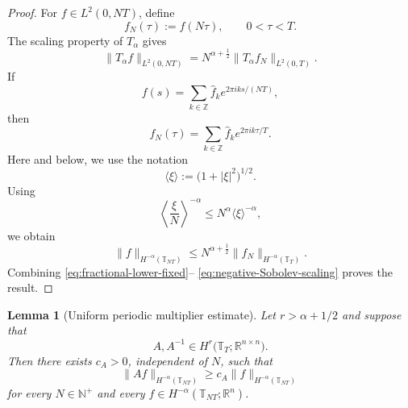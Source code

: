 \documentclass[preprint,12pt]{elsarticle}
\newtheorem{lemma}[theorem]{Lemma}
\theoremstyle{definition}
\theoremstyle{plain}
\begin{document}
\begin{proof}
For $f\in L^2(0,NT)$, define
\begin{equation*}
    f_N(\tau):=f(N\tau),
    \qquad
    0<\tau<T.
\end{equation*}
The scaling property of $T_\alpha$ gives
\begin{equation}
\label{eq:Talpha-scaling}
    \|T_\alpha f\|_{L^2(0,NT)}
    =
    N^{\alpha+\frac12}
    \|T_\alpha f_N\|_{L^2(0,T)}.
\end{equation}
If
\begin{equation*}
    f(s)
    =
    \sum_{k\in\mathbb Z}
    \widehat f_k e^{2\pi iks/(NT)},
\end{equation*}
then
\begin{equation*}
    f_N(\tau)
    =
    \sum_{k\in\mathbb Z}
    \widehat f_k e^{2\pi ik\tau/T}.
\end{equation*}
Here and below, we use the notation
\begin{equation*}
    \langle\xi\rangle
    :=
    \bigl(1+|\xi|^2\bigr)^{1/2}.
\end{equation*}
Using
\begin{equation*}
    \left\langle\frac{\xi}{N}\right\rangle^{-\alpha}
    \leq
    N^\alpha\langle\xi\rangle^{-\alpha},
\end{equation*}
we obtain
\begin{equation}
\label{eq:negative-Sobolev-scaling}
    \|f\|_{H^{-\alpha}(\mathbb T_{NT})}
    \leq
    N^{\alpha+\frac12}
    \|f_N\|_{H^{-\alpha}(\mathbb T_T)}.
\end{equation}
Combining
\eqref{eq:fractional-lower-fixed}--%
\eqref{eq:negative-Sobolev-scaling} proves the result.
\end{proof}

\begin{lemma}[Uniform periodic multiplier estimate]
\label{lem:uniform-periodic-multiplier}
Let $r>\alpha+1/2$ and suppose that
\begin{equation*}
    A,A^{-1}
    \in
    H^r
    \bigl(
        \mathbb T_T;\mathbb R^{n\times n}
    \bigr).
\end{equation*}
Then there exists $c_A>0$, independent of $N$, such that
\begin{equation}
\label{eq:uniform-periodic-multiplier}
    \|Af\|_{H^{-\alpha}(\mathbb T_{NT})}
    \geq
    c_A
    \|f\|_{H^{-\alpha}(\mathbb T_{NT})}
\end{equation}
for every $N\in\mathbb N^+$ and every
$f\in H^{-\alpha}(\mathbb T_{NT};\mathbb R^n)$.
\end{lemma}
\end{document}
